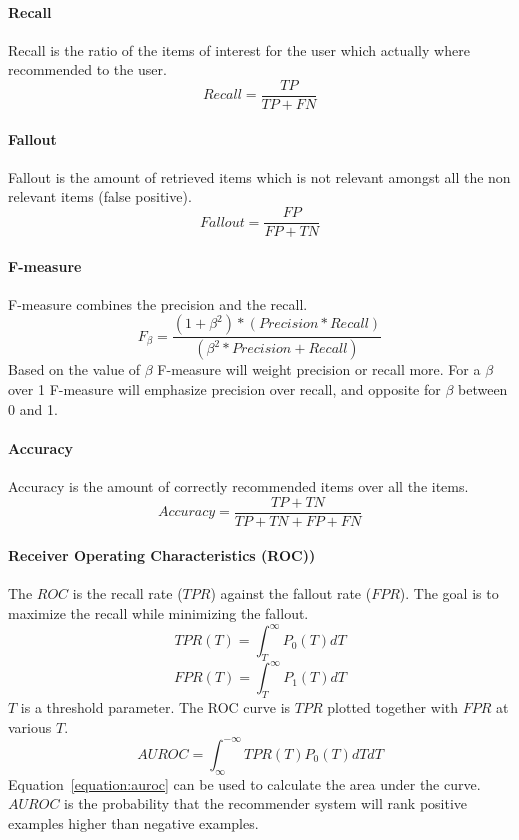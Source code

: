 \paragraph{Recall}
Recall is the ratio of the items of interest for the user which actually where recommended to the user.
\begin{equation}
    Recall = \frac{TP}{TP+FN}
    \label{equation:recall}
\end{equation}

\paragraph{Fallout}
Fallout is the amount of retrieved items which is not relevant amongst all the non relevant items (false positive).
\begin{equation}
    Fallout = \frac{FP}{FP+TN}
    \label{equation:fallout}
\end{equation}

\paragraph{F-measure}
F-measure combines the precision and the recall.
\begin{equation}
    F_\beta = \frac{(1 + \beta^2) * (Precision * Recall)}{(\beta^2 * Precision + Recall)}
    \label{equation:f-measure}
\end{equation}
Based on the value of $\beta$ F-measure will weight precision or recall more. For a $\beta$ over 1 F-measure will emphasize precision over recall, and opposite for $\beta$ between 0 and 1.

\paragraph{Accuracy}
Accuracy is the amount of correctly recommended items over all the items.
\begin{equation}
    Accuracy = \frac{TP+TN}{TP+TN+FP+FN}
    \label{equation:accuracy}
\end{equation}

\paragraph{Receiver Operating Characteristics (ROC))}
The $ROC$ is the recall rate ($TPR$) against the fallout rate ($FPR$).
The goal is to maximize the recall while minimizing the fallout.
\begin{equation}
    TPR(T) = \int_T^\infty P_0(T)dT
    \label{equation:tpr}
\end{equation}
\begin{equation}
    FPR(T) = \int_T^\infty P_1(T)dT
    \label{equation:fpr}
\end{equation}
$T$ is a threshold parameter.
The ROC curve is $TPR$ plotted together with $FPR$ at various $T$.
\begin{equation}
    AUROC = \int_\infty^{-\infty} TPR(T)P_0(T)dTdT
    \label{equation:auroc}
\end{equation}
Equation~\ref{equation:auroc} can be used to calculate the area under the curve.
$AUROC$ is the probability that the recommender system will rank positive examples higher than negative examples.

